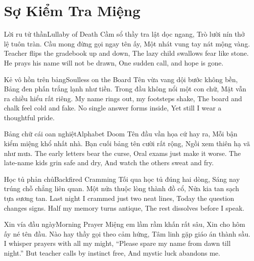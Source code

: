 \chapter{Sợ Kiểm Tra Miệng}

\begin{tutuyetbox}{Lời ru tử thần}{Lullaby of Death}
Cầm sổ thầy tra lật dọc ngang,
Trò lười nín thở lệ tuôn tràn.
Cầu mong đừng gọi ngay tên ấy,
Một nhát vung tay nát mộng vàng.
\tcblower
Teacher flips the gradebook up and down,
The lazy child swallows fear like stone.
He prays his name will not be drawn,
One sudden call, and hope is gone.
\end{tutuyetbox}

\begin{tutuyetbox}{Kẻ vô hồn trên bảng}{Soulless on the Board}
Tên vừa vang dội bước không bền,
Bảng đen phấn trắng lạnh như tiền.
Trong đầu không nổi một con chữ,
Mặt vẫn ra chiều hiểu rất riêng.
\tcblower
My name rings out, my footsteps shake,
The board and chalk feel cold and fake.
No single answer forms inside,
Yet still I wear a thoughtful pride.
\end{tutuyetbox}

\begin{tutuyetbox}{Bảng chữ cái oan nghiệt}{Alphabet Doom}
Tên đầu vần họa cứ hay ra,
Mỗi bận kiểm miệng khổ nhất nhà.
Bạn cuối bảng tên cười rất rộng,
Ngồi xem thiên hạ vã như mưa.
\tcblower
The early letters bear the curse,
Oral exams just make it worse.
The late-name kids grin safe and dry,
And watch the others sweat and fry.
\end{tutuyetbox}

\begin{tutuyetbox}{Học tủ phản chủ}{Backfired Cramming}
Tối qua học tủ đúng hai dòng,
Sáng nay trúng chỗ chẳng liên quan.
Một nửa thuộc lòng thành đồ cổ,
Nửa kia tan sạch tựa sương tan.
\tcblower
Last night I crammed just two neat lines,
Today the question changes signs.
Half my memory turns antique,
The rest dissolves before I speak.
\end{tutuyetbox}

\begin{tutuyetbox}{Xin vía đầu ngày}{Morning Prayer}
Miệng em lầm rầm khấn rất sâu,
Xin cho hôm ấy né tên đầu.
Nào hay thầy gọi theo cảm hứng,
Tâm linh gặp giáo án thành sầu.
\tcblower
I whisper prayers with all my might,
“Please spare my name from dawn till night.”
But teacher calls by instinct free,
And mystic luck abandons me.
\end{tutuyetbox}

